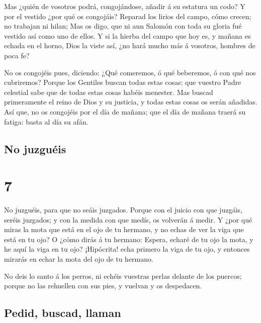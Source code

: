  Mas ¿quién de vosotros podrá, congojándose, añadir á su
estatura un codo?  Y por el vestido ¿por qué os
congojáis? Reparad los lirios del campo, cómo crecen; no trabajan ni
hilan;  Mas os digo, que ni aun Salomón con toda su
gloria fué vestido así como uno de ellos.  Y si la hierba
del campo que hoy es, y mañana es echada en el horno, Dios la viste así,
¿no hará mucho más á vosotros, hombres de poca fe?

 No os congojéis pues, diciendo: ¿Qué comeremos, ó qué
beberemos, ó con qué nos cubriremos?  Porque los Gentiles
buscan todas estas cosas: que vuestro Padre celestial sabe que de todas
estas cosas habéis menester.  Mas buscad primeramente el
reino de Dios y su justicia, y todas estas cosas os serán añadidas.
 Así que, no os congojéis por el día de mañana; que el
día de mañana traerá su fatiga: basta al día su afán.

\hypertarget{no-juzguuxe9is}{%
\subsection{No juzguéis}\label{no-juzguuxe9is}}

\hypertarget{section-6}{%
\section{7}\label{section-6}}

 No juzguéis, para que no seáis juzgados. 
Porque con el juicio con que juzgáis, seréis juzgados; y con la medida
con que medís, os volverán á medir.  Y ¿por qué miras la
mota que está en el ojo de tu hermano, y no echas de ver la viga que
está en tu ojo?  O ¿cómo dirás á tu hermano: Espera,
echaré de tu ojo la mota, y he aquí la viga en tu ojo? 
¡Hipócrita! echa primero la viga de tu ojo, y entonces mirarás en echar
la mota del ojo de tu hermano.

 No deis lo santo á los perros, ni echéis vuestras perlas
delante de los puercos; porque no las rehuellen con sus pies, y vuelvan
y os despedacen.

\hypertarget{pedid-buscad-llaman}{%
\subsection{Pedid, buscad, llaman}\label{pedid-buscad-llaman}}

